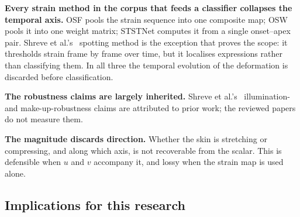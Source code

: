\textbf{Every strain method in the corpus that feeds a classifier collapses the temporal axis.} OSF pools the strain sequence into one composite map; OSW pools it into one weight matrix; STSTNet computes it from a single onset--apex pair. Shreve et al.'s~\cite{shreve2011} spotting method is the exception that proves the scope: it thresholds strain frame by frame over time, but it localises expressions rather than classifying them. In all three the temporal evolution of the deformation is discarded before classification.

\textbf{The robustness claims are largely inherited.} Shreve et al.'s~\cite{shreve2011} illumination- and make-up-robustness claims are attributed to prior work; the reviewed papers do not measure them.

\textbf{The magnitude discards direction.} Whether the skin is stretching or compressing, and along which axis, is not recoverable from the scalar. This is defensible when $u$ and $v$ accompany it, and lossy when the strain map is used alone.

\subsection{Implications for this research}
\label{sec:strain-implications}

